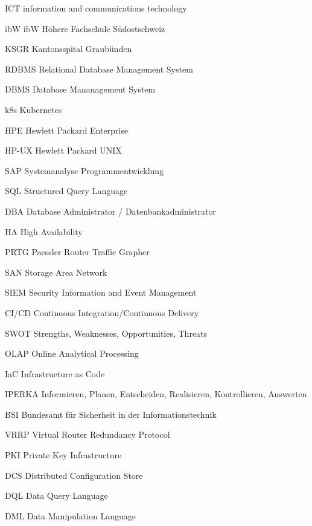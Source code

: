 
\begin{abkuerzungen}[MUSTER] %
    \item[ICT] information and communications technology
    \item[ibW] ibW Höhere Fachschule Südostschweiz
    \item[KSGR] Kantonsspital Graubünden
    \item[\Gls{RDBMS}] Relational Database Management System
    \item[\Gls{DBMS}] Database Mananagement System
    \item[k8s] \Gls{Kubernetes}
    \item[HPE] Hewlett Packard Enterprise
    \item[\Gls{HP-UX}] Hewlett Packard \Gls{UNIX}
    \item[SAP] Systemanalyse Programmentwicklung
    \item[SQL] Structured Query Language
    \item[DBA] Database Administrator / Datenbankadministrator
    \item[HA] High Availability
    \item[\Gls{PRTG}] Paessler Router Traffic Grapher
    \item[\Gls{SAN}] Storage Area Network
    \item[\Gls{SIEM}] Security Information and Event Management
    \item[\Gls{CI/CD}] Continuous Integration/Continuous Delivery
    \item[\Gls{SWOT}] Strengths, Weaknesses, Opportunities, Threats
    \item[\Gls{OLAP}] Online Analytical Processing
    \item[IaC] Infrastructure as Code
    \item[IPERKA] Informieren, Planen, Entscheiden, Realisieren, Kontrollieren, Auswerten
    \item[BSI] Bundesamt für Sicherheit in der Informationstechnik
    \item[\Gls{VRRP}] Virtual Router Redundancy Protocol
    \item[\Gls{PKI}] Private Key Infrastructure
    \item[DCS] Distributed Configuration Store
    \item[DQL] Data Query Language
    \item[DML] Data Manipulation Language
\end{abkuerzungen}